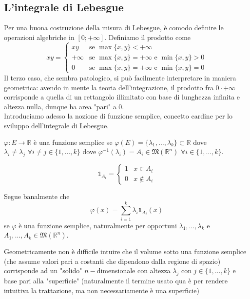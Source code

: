 \subsection{L'integrale di Lebesgue}
Per una buona costruzione della misura di Lebesgue, è comodo definire le operazioni algebriche in $[0; +\infty]$. Definiamo il prodotto come
\begin{equation*}
	xy = \begin{cases}
		xy & \text{se } \max\{x, y \} < +\infty \\
		+\infty & \text{se } \max\{x, y \} = +\infty \text{ e } \min\{x, y \} > 0 \\
		0 & \text{se } \max\{x, y \} = +\infty \text{ e } \min\{x, y \} = 0
	\end{cases}
\end{equation*}
Il terzo caso, che sembra patologico, si può facilmente interpretare in maniera geometrica: avendo in mente la teoria dell'integrazione, il prodotto fra $0 \cdot +\infty$ corrisponde a quella di un rettangolo illimitato con base di lunghezza infinita e
altezza nulla, dunque ha area "pari" a 0. \\
Introduciamo adesso la nozione di funzione semplice, concetto cardine per lo sviluppo dell'integrale di Lebesgue.
%
\vspace{0.5cm}
\begin{definition}[\textcolor{blue}{funzione semplice}]
	$\varphi: E \to \mathbb{R}$ è una funzione semplice se $\varphi(E)=\{\lambda_1, \ldots, \lambda_k \} \subset \mathbb{R}$ dove $\lambda_i \neq \lambda_j \, \, \forall i \neq j \in \{1, \ldots, k \}$ dove
	$\varphi^{-1}(\lambda_i) = A_i \in \mathfrak{M}(\mathbb{R}^n) \, \, \forall i \in \{1, \ldots, k \}$.
\end{definition}
%
\vspace{0.5cm}
\begin{definition}[\textcolor{blue}{funzione caratteristica}]
	$$
		\mathbb{1}_{A_i} = \begin{cases} 1 & x \in A_i \\ 0 & x \not\in A_i \end{cases}
	$$
\end{definition}
%
\begin{remark}
Segue banalmente che
$$
\varphi(x) = \sum_{i=1}^k \lambda_i \mathbb{1}_{A_i} (x)
$$
se $\varphi$ è una funzione semplice, naturalmente per opportuni $\lambda_1, \ldots, \lambda_k$ e $A_1, \ldots, A_k \in \mathfrak{M}(\mathbb{R}^n)$.
\end{remark}
%
Geometricamente non è difficile intuire che il volume sotto una funzione semplice (che assume valori pari a costanti che dipendono dalla regione di spazio) corrisponde ad un "solido" $n-$dimensionale con altezza $\lambda_j$ con $j \in \{1, \ldots, k \}$ e base pari alla "superficie" (naturalmente il termine usato qua è per rendere intuitiva la trattazione, ma non necessariamente è una superficie) 
